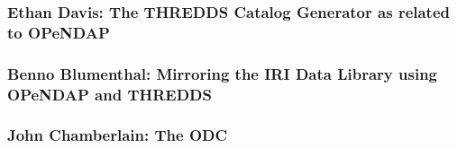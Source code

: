 \subsubsection{Ethan Davis:  The \ac{THREDDS} Catalog Generator as related
                   to \ac{OPeNDAP}}

\subsubsection{Benno Blumenthal:  Mirroring the \ac{IRI} Data Library using \ac{OPeNDAP} and \ac{THREDDS}}

\subsubsection{John Chamberlain:  The ODC}


%
%
%
%

